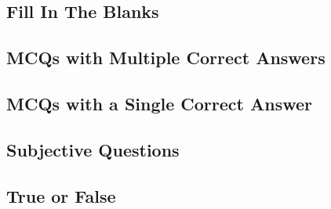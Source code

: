 \subsection*{Fill In The Blanks}
\begin{enumerate}[label=\thesubsection.\arabic*,ref=\thesubsection.\theenumi]





\end{enumerate}
\subsection*{MCQs with Multiple Correct Answers}
\begin{enumerate}[label=\thesubsection.\arabic*,ref=\thesubsection.\theenumi]






\end{enumerate}
\subsection*{MCQs with a Single Correct Answer}
\begin{enumerate}[label=\thesubsection.\arabic*,ref=\thesubsection.\theenumi]







\end{enumerate}
\subsection*{Subjective Questions}
\begin{enumerate}[label=\thesubsection.\arabic*,ref=\thesubsection.\theenumi]




\end{enumerate}
\subsection*{True or False}
\begin{enumerate}[label=\thesubsection.\arabic*,ref=\thesubsection.\theenumi]




\end{enumerate}
